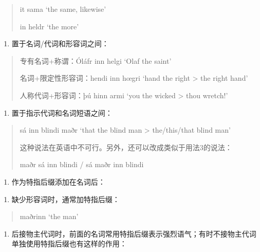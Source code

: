 \begin{quote}
  it sama `the same, likewise'

  in heldr `the more'
\end{quote}

\begin{enumerate}
  \def\labelenumi{\arabic{enumi})}
  \setcounter{enumi}{2}
  \item
        置于名词/代词和形容词之间：
\end{enumerate}

\begin{quote}
  专有名词+称谓：Óláfr inn helgi `Olaf the saint'

  名词+限定性形容词：hendi inn hœgri `hand the right \textgreater{} the
  right hand'

  人称代词+形容词：þú hinn armi `you the wicked \textgreater{} thou
  wretch!'
\end{quote}

\begin{enumerate}
  \def\labelenumi{\arabic{enumi})}
  \setcounter{enumi}{3}
  \item
        置于指示代词和名词短语之间：
\end{enumerate}

\begin{quote}
  sá inn blindi maðr `that the blind man \textgreater{} the/this/that
  blind man'

  这种说法在英语中不可行。另外，还可以改成类似于用法3的说法：

  maðr sá inn blindi / sá maðr inn blindi
\end{quote}

\begin{enumerate}
  \def\labelenumi{\Alph{enumi}.}
  \setcounter{enumi}{1}
  \item
        作为特指后缀添加在名词后：
\end{enumerate}

\begin{enumerate}
  \def\labelenumi{\arabic{enumi})}
  \item
        缺少形容词时，通常加特指后缀：
\end{enumerate}

\begin{quote}
  maðrinn `the man'
\end{quote}

\begin{enumerate}
  \def\labelenumi{\arabic{enumi})}
  \setcounter{enumi}{1}
  \item
        后接物主代词时，前面的名词常用特指后缀表示强烈语气；有时不接物主代词单独使用特指后缀也有这样的作用：
\end{enumerate}

